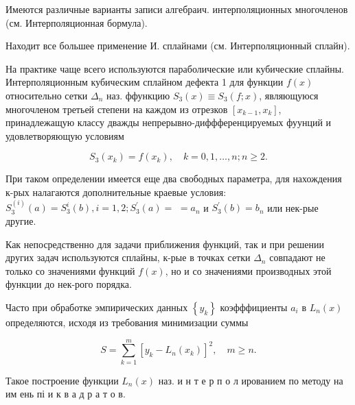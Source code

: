\documentclass[10pt]{article}
\begin{document}
Имеются различные варианты записи алгебраич. интерполяционных многочленов (см. Интерполяционная бормула).



Находит все большее применение И. сплайнами (см. Интерполяционный сплайн).



На практике чаще всего используются параболические или кубические сплайны. Интерполяционным кубическим сплайном дефекта 1 для функции $f(x)$ относительно сетки $\Delta_{n}$ наз. ффункцию $S_{3}(x) \equiv S_{3}(f ; x)$, являющуюся многочленом третьей степени на каждом из отрезков $\left[x_{k-1}, x_{k}\right]$, принадлежащую классу дважды непрерывно-диффференцируемых фуунций и удовлетворяющую условиям



\[

S_{3}\left(x_{k}\right)=f\left(x_{k}\right), \quad k=0,1, \ldots, n ; n \geqslant 2 .

\]



При таком определении имеется еще два свободных параметра, для нахождения к-рых налагаются дополнительные краевые условия: $S_{3}^{(i)}(a)=S_{3}^{i}(b), i=1,2 ; S_{3}^{\prime}(a)=$ $=a_{n}$ и $S_{3}^{\prime}(b)=b_{n}$ или нек-рые другие.



Как непосредственно для задачи приближения функций, так и при решении других задач используются сплайны, к-рые в точках сетки $\Delta_{n}$ совпадают не только со значениями функций $f(x)$, но и со значениями производных этой функции до нек-рого порядка.



Часто при обработке эмпирических данных $\left\{y_{k}\right\}$ коэфффициенты $a_{i}$ в $L_{n}(x)$ определяются, исходя из требования минимизации суммы



\[

S=\sum_{k=1}^{m}\left[y_{k}-L_{n}\left(x_{k}\right)\right]^{2}, \quad m \geqslant n .

\]



Такое построение функции $L_{n}(x)$ наз. и н т е р п о л ированием по методу на им ень пі и к в а д р а т о в.
\end{document}
